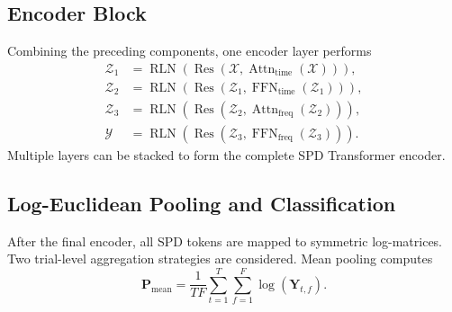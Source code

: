 \subsection{Encoder Block}

Combining the preceding components, one encoder layer performs
\begin{align}
    \bm{\mathcal{Z}}_1
    &=
    \operatorname{RLN}\left(
        \operatorname{Res}
        \left(
            \bm{\mathcal{X}},
            \operatorname{Attn}_{\mathrm{time}}
            (\bm{\mathcal{X}})
        \right)
    \right),\\
    \bm{\mathcal{Z}}_2
    &=
    \operatorname{RLN}\left(
        \operatorname{Res}
        \left(
            \bm{\mathcal{Z}}_1,
            \operatorname{FFN}_{\mathrm{time}}
            (\bm{\mathcal{Z}}_1)
        \right)
    \right),\\
    \bm{\mathcal{Z}}_3
    &=
    \operatorname{RLN}\left(
        \operatorname{Res}
        \left(
            \bm{\mathcal{Z}}_2,
            \operatorname{Attn}_{\mathrm{freq}}
            (\bm{\mathcal{Z}}_2)
        \right)
    \right),\\
    \bm{\mathcal{Y}}
    &=
    \operatorname{RLN}\left(
        \operatorname{Res}
        \left(
            \bm{\mathcal{Z}}_3,
            \operatorname{FFN}_{\mathrm{freq}}
            (\bm{\mathcal{Z}}_3)
        \right)
    \right).
\end{align}
Multiple layers can be stacked to form the complete SPD Transformer encoder.

\subsection{Log-Euclidean Pooling and Classification}

After the final encoder, all SPD tokens are mapped to symmetric log-matrices.
Two trial-level aggregation strategies are considered. Mean pooling computes
\begin{equation}
    \bm{P}_{\mathrm{mean}}
    =
    \frac{1}{TF}
    \sum_{t=1}^{T}\sum_{f=1}^{F}
    \log(\bm{Y}_{t,f}).
\end{equation}

